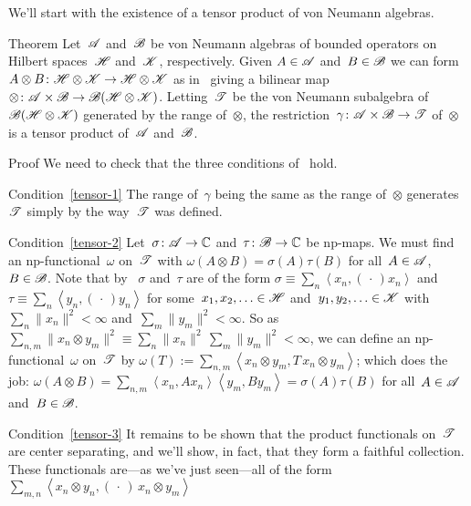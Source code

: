 \documentclass[a]{subfiles}
\begin{document}
\begin{parsec}%
\begin{point}%
We'll start with the existence
of a tensor product of von Neumann algebras.
\end{point}
\begin{point}{Theorem}%
Let~$\mathscr{A}$
and~$\mathscr{B}$
be von Neumann algebras
of bounded operators
on Hilbert spaces~$\mathscr{H}$ and~$\mathscr{K}$,
respectively.
Given $A\in\mathscr{A}$ and~$B\in\mathscr{B}$
we can form $A\otimes B\colon \mathscr{H}\otimes \mathscr{K}\to\mathscr{H}\otimes \mathscr{K}$
as in~ giving 
a bilinear map $\otimes\colon \mathscr{A}\times \mathscr{B}\to \mathscr{B}(\mathscr{H}\otimes\mathscr{K})$.
Letting~$\mathscr{T}$ 
be the von Neumann subalgebra
of $\mathscr{B}(\mathscr{H}\otimes\mathscr{K})$
generated by the range of~$\otimes$,
the restriction~$\gamma\colon \mathscr{A}\times \mathscr{B}\to\mathscr{T}$
of~$\otimes$
is a tensor product of~$\mathscr{A}$ and~$\mathscr{B}$.
\begin{point}{Proof}%
We need to check that the three conditions of~ hold.
\begin{point}{Condition~\ref{tensor-1}}%
The range of~$\gamma$ being the same as the range of~$\otimes$
generates~$\mathscr{T}$ 
simply by the way~$\mathscr{T}$ was defined.
\end{point}
\begin{point}{Condition~\ref{tensor-2}}%
Let~$\sigma\colon \mathscr{A}\to\mathbb{C}$
and~$\tau\colon \mathscr{B}\to\mathbb{C}$ be np-maps.
We must find an np-functional~$\omega$ on~$\mathscr{T}$
with $\omega(A\otimes B)=\sigma(A)\tau(B)$
for all~$A\in \mathscr{A}$, $B\in \mathscr{B}$.
Note that by~
$\sigma$ and~$\tau$ are of the form
$\sigma\equiv\sum_n \left<x_n,(\,\cdot\,)x_n\right>$
and~$\tau\equiv\sum_n \left<y_n,(\,\cdot\,)y_n\right>$
for some~$x_1,x_2,\dotsc\in\mathscr{H}$
and~$y_1,y_2,\dotsc\in\mathscr{K}$
with~$\sum_n\|x_n\|^2<\infty$
and~$\sum_m\|y_m\|^2 <\infty$.
So as~$\sum_{n,m}\|x_n\otimes y_m\|^2\equiv\sum_n \|x_n\|^2\,
\sum_m\|y_m\|^2 <\infty$,
we can define
an np-functional~$\omega$ on~$\mathscr{T}$
by $\omega(T):= \sum_{n,m} \left<x_n\otimes y_m,
T\,x_n\otimes y_m\right>$;
which does the job:  $\omega(A\otimes B)
= \sum_{n,m} \left<x_n, Ax_n\right> \left<y_m,By_m\right>
= \sigma(A)\tau(B)$
for all~$A\in\mathscr{A}$ and~$B\in\mathscr{B}$.
\end{point}
\begin{point}{Condition~\ref{tensor-3}}%
It remains to be shown that the
product functionals
on~$\mathscr{T}$ are center separating,
and we'll show, in fact, that they form a faithful collection.
These functionals are---as we've just seen---all
of the form
$\sum_{m,n}\left<x_n\otimes y_n,(\,\cdot\,)\,x_n\otimes y_m\right>$

\end{point}
\end{point}
\end{point}
\end{parsec}
\end{document}
